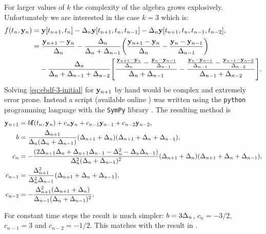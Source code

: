 For larger values of $k$ the complexity of the algebra grows explosively.
Unfortunately we are interested in the case $k=3$ which is:
\begin{equation}
  \begin{aligned}
    f(t_n, \mathbf{y}_n) &= \mathbf{y}[t_{n+1}, t_n] - \Delta_{n} \mathbf{y}[t_{n+1}, t_n, t_{n-1}] -\Delta_{n} \mathbf{y}[t_{n+1}, t_n, t_{n-1}, t_{n-2}], \\
    &=  \frac{\mathbf{y}_{n+1} - \mathbf{y}_n}{\Delta_{n}} 
    - \frac{\Delta_{n}}{\Delta_{n} + \Delta_{n-1}} {\left(  \frac{\mathbf{y}_{n+1} - \mathbf{y}_n}{\Delta_{n}} - \frac{\mathbf{y}_n - \mathbf{y}_{n-1}}{\Delta_{n-1}} \right)} \\
    &\quad - \frac{\Delta_{n}}{\Delta_{n} + \Delta_{n-1} + \Delta_{n-2}}
         {\left[ 
           \frac{\frac{\mathbf{y}_{n+1} - \mathbf{y}_n}{\Delta_{n}} - \frac{\mathbf{y}_n - \mathbf{y}_{n-1}}{\Delta_{n-1}}}
                {\Delta_{n} +\Delta_{n-1}}
           -
           \frac{\frac{\mathbf{y}_{n} - \mathbf{y}_{n-1}}{\Delta_{n-1}} - \frac{\mathbf{y}_{n-1} - \mathbf{y}_{n-2}}{\Delta_{n-2}}}
                {\Delta_{n-1} +\Delta_{n-2}}
          \right]}.
  \end{aligned}
  \label{eq:ebdf-3-initial}
\end{equation}
Solving \cref{eq:ebdf-3-initial} for $\mathbf{y}_{n+1}$ by hand would be complex and extremely error prone.
Instead a script (available online \cite{ebdf3-sympy-script}) was written using the \texttt{python} programming language with the \texttt{SymPy} library \cite{sympy}.
The resulting method is
\begin{equation}
  \label{eqn:ebdf-coeffs}
  \begin{aligned}
    \mathbf{y}_{n+1} &= b {\mathbf{f}}(t_n, \mathbf{y}_n) + c_n \mathbf{y}_n + c_{n-1} \mathbf{y}_{n-1} + c_{n-2} \mathbf{y}_{n-2}, \\
    b &= \frac{\Delta_{n+1}}{\Delta_{n} (\Delta_{n} + \Delta_{n-1})} (\Delta_{n+1} + \Delta_{n}) (\Delta_{n+1} + \Delta_{n} + \Delta_{n-1}) ,\\
    c_n &= - \frac{ (2 \Delta_{n+1} \Delta_{n} + \Delta_{n+1} \Delta_{n-1} - \Delta_{n}^{2} - \Delta_{n} \Delta_{n-1}) }{\Delta_{n}^{2} (\Delta_{n} + \Delta_{n-1})^{2}} (\Delta_{n+1} + \Delta_{n}) (\Delta_{n+1} + \Delta_{n} + \Delta_{n-1}),\\
    c_{n-1} &= \frac{\Delta_{n+1}^{2}}{\Delta_{n}^{2} \Delta_{n-1}} (\Delta_{n+1} + \Delta_{n} + \Delta_{n-1}) ,\\
    c_{n-2} &= - \frac{\Delta_{n+1}^{2} (\Delta_{n+1} + \Delta_{n})}{\Delta_{n-1} (\Delta_{n} + \Delta_{n-1})^{2}}.
  \end{aligned}
\end{equation}

For constant time steps the result is much simpler: $ b = 3\Delta_{n}$, $c_n = -3/2$, $c_{n-1} = 3$ and  $c_{n-2} = -1/2$.
This matches with the result in \cite[364]{HairerNorsettWanner}.

